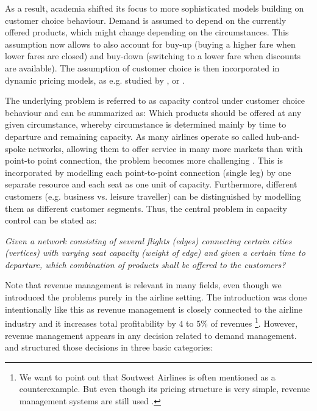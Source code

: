 As a result, academia shifted its focus to more sophisticated models building on customer choice behaviour. Demand is assumed to depend on the currently offered products, which might change depending on the circumstances. This assumption now allows to also account for buy-up (buying a higher fare when lower fares are closed) and buy-down (switching to a lower fare when discounts are available). The assumption of customer choice is then incorporated in dynamic pricing models, as e.g. studied by \cite{Gallego.1997}, \cite{Bitran.1998} or \cite{Feng.2000}.

The underlying problem is referred to as capacity control under customer choice behaviour and can be summarized as: Which products should be offered at any given circumstance, whereby circumstance is determined mainly by time to departure and remaining capacity. As many airlines operate so called hub-and-spoke networks, allowing them to offer service in many more markets than with point-to point connection, the problem becomes more challenging \cite{Talluri.2005}. This is incorporated by modelling each point-to-point connection (single leg) by one separate resource and each seat as one unit of capacity. Furthermore, different customers (e.g. business vs. leisure traveller) can be distinguished by modelling them as different customer segments. Thus, the central problem in capacity control can be stated as:

\begin{center}
	\emph{Given a network consisting of several flights (edges) connecting certain cities (vertices) with varying seat capacity (weight of edge) and given a certain time to departure, which combination of products shall be offered to the customers?}
\end{center} 

Note that revenue management is relevant in many fields, even though we introduced the problems purely in the airline setting. The introduction was done intentionally like this as revenue management is closely connected to the airline industry and it increases total profitability by $4$ to $5 \%$ of revenues \cite{Talluri.2005}\footnote{We want to point out that Soutwest Airlines is often mentioned as a counterexample. But even though its pricing structure is very simple, revenue management systems are still used \cite{Talluri.2005}.}. However, revenue management appears in any decision related to demand management. and \cite{Talluri.2005} structured those decisions in three basic categories:

